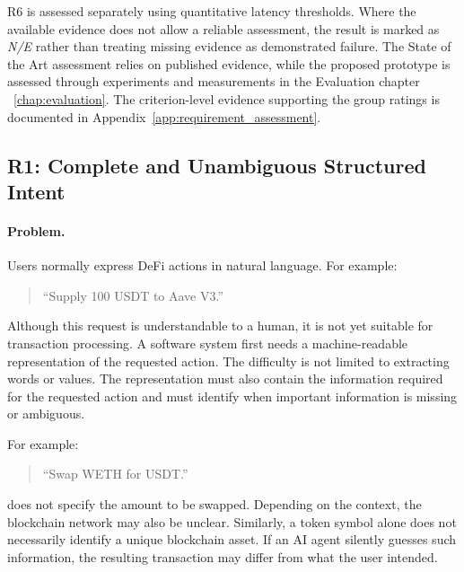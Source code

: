 R6 is assessed separately using quantitative latency
thresholds. Where the available evidence does not allow
a reliable assessment, the result is marked as
\textit{N/E} rather than treating missing evidence as
demonstrated failure. The State of the Art assessment
relies on published evidence, while the proposed prototype
is assessed through experiments and measurements in the
Evaluation chapter ~\ref{chap:evaluation}. The criterion-level evidence supporting the group ratings
is documented in Appendix~\ref{app:requirement_assessment}.





\subsection{R1: Complete and Unambiguous Structured Intent}
\label{subsec:r1_structured_intent}

\paragraph{Problem.}

Users normally express DeFi actions in natural language. For example:

\begin{quote}
``Supply 100 USDT to Aave V3.''
\end{quote}

Although this request is understandable to a human, it is not yet suitable for
transaction processing. A software system first needs a machine-readable
representation of the requested action. The difficulty is not limited to extracting words or values. The representation
must also contain the information required for the requested action and must
identify when important information is missing or ambiguous.

For example:

\begin{quote}
``Swap WETH for USDT.''
\end{quote}

does not specify the amount to be swapped. Depending on the context, the
blockchain network may also be unclear. Similarly, a token symbol alone does
not necessarily identify a unique blockchain asset. If an AI agent silently guesses such information, the resulting transaction
may differ from what the user intended.

